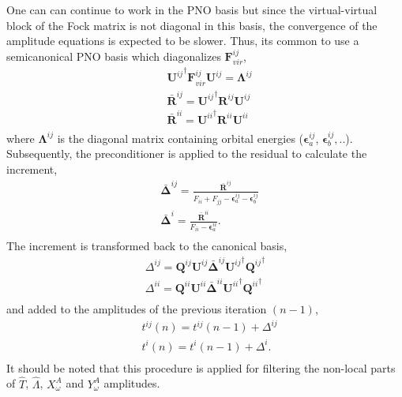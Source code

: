 One can can continue to work in the PNO basis but since the virtual-virtual block of the Fock matrix is 
not diagonal in this basis, the convergence of the amplitude equations is expected to be slower. Thus, its common to 
use a semicanonical PNO basis which diagonalizes $\bm{F}^{ij}_{vir}$,
\begin{equation}
\begin{split}
&{\bm{U}^{ij}}^{\dagger} \bm{F}^{ij}_{vir} \bm{U}^{ij} = \bm{\Lambda}^{ij} \\
&\bm{\bar{R}}^{ij} = {\bm{U}^{ij}}^{\dagger} \bm{R}^{ij} \bm{U}^{ij}\\
&\bm{\bar{R}}^{ii} = {\bm{U}^{ii}}^{\dagger} \bm{R}^{ii} \bm{U}^{ii}\\
\end{split}
\end{equation}
where $\bm{\Lambda}^{ij}$ is the diagonal matrix containing orbital energies ($\bm{\epsilon}^{ij}_{a}$, $\bm{\epsilon}^{ij}_{b}, ..$).
Subsequently, the preconditioner is applied to the residual to calculate the increment,
\begin{equation}
\begin{split}
&{\bm{\bar{\Delta}}}^{ij} = \frac{\bm{\bar{R}}^{ij}}{F_{ii} + F_{jj} - \bm{\epsilon}^{ij}_{a} - \bm{\epsilon}^{ij}_{b}} \\
&{\bm{\bar{\Delta}}}^{i} = \frac{\bm{\bar{R}}^{ii}}{F_{ii} - \bm{\epsilon}^{ii}_{a}}.\\
\end{split}
\end{equation}
The increment is transformed back to the canonical basis,
\begin{equation}
\begin{split}
{\Delta}^{ij} = \bm{Q}^{ij}\bm{U}^{ij} {\bm{\bar{\Delta}}}^{ij} {\bm{U}^{ij}}^{\dagger} {\bm{Q}^{ij}}^{\dagger}\\
{\Delta}^{ii} = \bm{Q}^{ii}\bm{U}^{ii} {\bm{\bar{\Delta}}}^{ii} {\bm{U}^{ii}}^{\dagger} {\bm{Q}^{ii}}^{\dagger}\\
\end{split}
\end{equation}
and added to the amplitudes of the previous iteration $(n-1)$,
\begin{equation}
\begin{split}
&t^{ij}(n) = t^{ij}(n-1) + \Delta^{ij}\\
&t^{i}(n) = t^{i}(n-1) + \Delta^{i}.\\
\end{split}
\end{equation}
It should be noted that this procedure is applied for filtering the non-local parts of $\hat{T}$, $\hat{\Lambda}$, $X^{A}_{\omega}$ 
and $Y^{A}_{\omega}$ amplitudes. 
